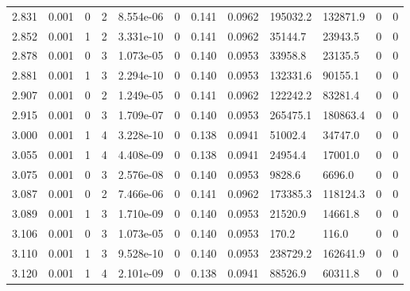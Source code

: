 \documentclass[preview]{standalone}
\begin{document}
{{{{\begin{tabular}{L{1.2cm}C{1.2cm} C{0.3cm}C{0.5cm} C{1.4cm}C{1.4cm} C{1.4cm}C{1.4cm} C{1.6cm}C{1.6cm} C{1.6cm}C{1.6cm}}
  2.831  &  0.001  & 0     &  2 &  8.554e-06  & 0  &  0.141&   0.0962& 195032.2 & 132871.9   &  0 & 0  \\ 
  2.852  &  0.001  & 1     &  2 &  3.331e-10  & 0  &  0.141&   0.0962& 35144.7 & 23943.5   &  0 & 0  \\ 
  2.878  &  0.001  & 0     &  3 &  1.073e-05  & 0  &  0.140&   0.0953& 33958.8 & 23135.5   &  0 & 0  \\ 
  2.881  &  0.001  & 1     &  3 &  2.294e-10  & 0  &  0.140&   0.0953& 132331.6 & 90155.1   &  0 & 0  \\ 
  2.907  &  0.001  & 0     &  2 &  1.249e-05  & 0  &  0.141&   0.0962& 122242.2 & 83281.4   &  0 & 0  \\ 
  2.915  &  0.001  & 0     &  3 &  1.709e-07  & 0  &  0.140&   0.0953& 265475.1 & 180863.4   &  0 & 0  \\ 
  3.000  &  0.001  & 1     &  4 &  3.228e-10  & 0  &  0.138&   0.0941& 51002.4 & 34747.0   &  0 & 0  \\ 
  3.055  &  0.001  & 1     &  4 &  4.408e-09  & 0  &  0.138&   0.0941& 24954.4 & 17001.0   &  0 & 0  \\ 
  3.075  &  0.001  & 0     &  3 &  2.576e-08  & 0  &  0.140&   0.0953& 9828.6 & 6696.0   &  0 & 0  \\ 
  3.087  &  0.001  & 0     &  2 &  7.466e-06  & 0  &  0.141&   0.0962& 173385.3 & 118124.3   &  0 & 0  \\ 
  3.089  &  0.001  & 1     &  3 &  1.710e-09  & 0  &  0.140&   0.0953& 21520.9 & 14661.8   &  0 & 0  \\ 
  3.106  &  0.001  & 0     &  3 &  1.073e-05  & 0  &  0.140&   0.0953& 170.2 & 116.0   &  0 & 0  \\ 
  3.110  &  0.001  & 1     &  3 &  9.528e-10  & 0  &  0.140&   0.0953& 238729.2 & 162641.9   &  0 & 0  \\ 
  3.120  &  0.001  & 1     &  4 &  2.101e-09  & 0  &  0.138&   0.0941& 88526.9 & 60311.8   &  0 & 0  \\ 
\hline 
\end{tabular} 

}}}}
\end{document}
